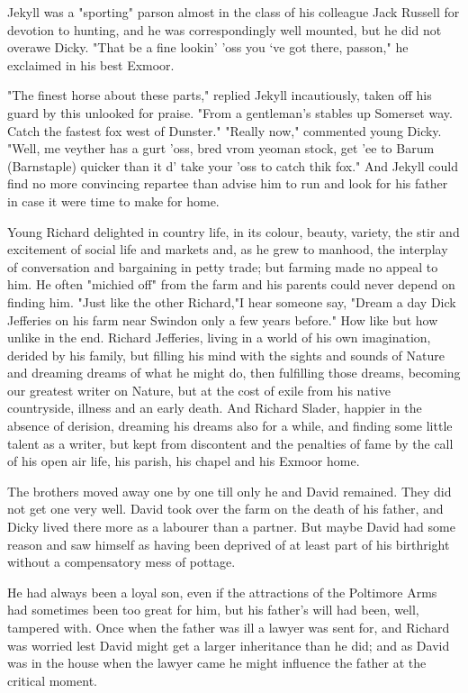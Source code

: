 Jekyll was a "sporting" parson almost in the class of his colleague Jack Russell for devotion to hunting, and he was correspondingly well mounted, but he did not overawe Dicky. "That be a fine lookin' 'oss you ‘ve got there, passon," he exclaimed in his best Exmoor.

"The finest horse about these parts," replied Jekyll incautiously, taken off his guard by this unlooked for praise. "From a gentleman's stables up Somerset way. Catch the fastest fox west of Dunster."
 "Really now," commented young Dicky. "Well, me veyther has a gurt 'oss, bred vrom yeoman stock, get 'ee to Barum (Barnstaple) quicker than it d' take your 'oss to catch thik fox."
 And Jekyll could find no more convincing repartee than advise him to run and look for his father in case it were time to make for home.

\Flourish 

Young Richard delighted in country life, in its colour, beauty, variety, the stir and excitement of social life and markets and, as he grew to manhood, the interplay of conversation and bargaining in petty trade; but farming made no appeal to him. He often "michied off" from the farm and his parents could never depend on finding him. "Just like the other Richard,"I hear someone say, "Dream a day Dick Jefferies on his farm near Swindon only a few years before." How like   but how unlike in the end. Richard Jefferies, living in a world of his own imagination, derided by his family, but filling his mind with the sights and sounds of Nature and dreaming dreams of what he might do, then fulfilling those dreams, becoming our greatest writer on Nature, but at the cost of exile from his native countryside, illness and an early death. And Richard Slader, happier in the absence of derision, dreaming his dreams also for a while, and finding some little talent as a writer, but kept from discontent and the penalties of fame by the call of his open air life, his parish, his chapel and his Exmoor home.

The brothers moved away one by one till only he and David remained. They did not get one very well. David took over the farm on the death of his father, and Dicky lived there more as a labourer than a partner. But maybe David had some reason and saw himself as having been deprived of at least part of his birthright without a compensatory mess of pottage.

He had always been a loyal son, even if the attractions of the Poltimore Arms had sometimes been too great for him, but his father’s will had been, well, tampered with. Once when the father was ill a lawyer was sent for, and Richard was worried lest David might get a larger inheritance than he did; and as David was in the house when the lawyer came he might influence the father at the critical moment. 

